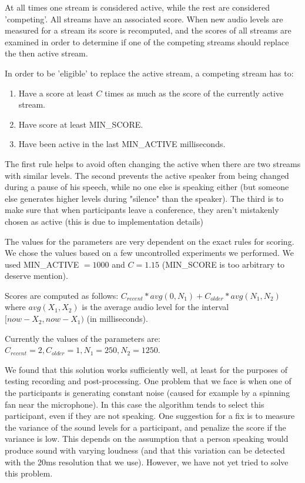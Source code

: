 \documentclass[twoside,openright,a4paper,12pt,english]{article}
\begin{document}
At all times one stream is considered active, while the rest are considered
'competing'. All streams have an associated score. When new audio levels are
measured for a stream its score is recomputed,
and the scores of all streams are examined in order to determine if one of
the competing streams should replace the then active stream.

In order to be 'eligible' to replace the active stream, a competing stream has to:
\begin{enumerate}
    \item Have a score at least $C$ times as much as the score of the currently active stream.
    \item Have score at least MIN\_SCORE.
    \item Have been active in the last MIN\_ACTIVE milliseconds.
\end{enumerate}

The first rule helps to avoid often changing the active when there are two
streams with similar levels. The second prevents the active speaker from being
changed during a pause of his speech, while no one else is speaking either (but
someone else generates higher levels during "silence" than the speaker). The
third is to make sure that when participants leave a conference, they aren't
mistakenly chosen as active (this is due to implementation details)

The values for the parameters are very dependent on the exact rules for scoring.
We chose the values based on a few uncontrolled experiments we performed. We used
MIN\_ACTIVE $= 1000$ and $C = 1.15$ (MIN\_SCORE is too arbitrary to deserve mention).

Scores are computed as follows: $C_{recent} * avg(0, N_1) + C_{older} * avg(N_1, N_2)$
where $avg(X_1, X_2)$ is the average audio level for the interval $[now-X_2,
now-X_1)$ (in milliseconds). 

Currently the values of the parameters are: $C_{recent} = 2, C_{older} = 1, N_1 = 250, N_2 = 1250$.


\bigskip
We found that this solution works sufficiently well, at least for the purposes
of testing recording and post-processing. One problem that we face is when
one of the participants is generating constant noise (caused for example by a
spinning fan near the microphone). In this case the algorithm tends to select this participant,
even if they are not speaking. One suggestion for a fix is to measure the
variance of the sound levels for a participant, and penalize the score if the
variance is low. This depends on the assumption that a person speaking would
produce sound with varying loudness (and that this variation can be detected
with the 20ms resolution that we use). However, we have not yet tried to solve
this problem.
\end{document}
